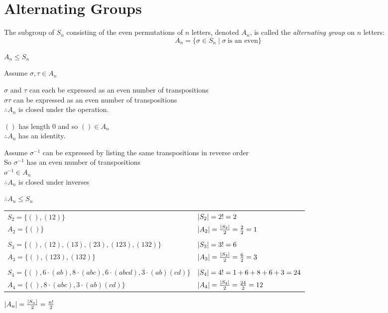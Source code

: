 \documentclass[letterpaper,12pt,fleqn]{article}
\renewcommand{\o}{\sigma}
\renewcommand{\t}{\tau}
\begin{document}
\section*{Alternating Groups}

\begin{definition}
  The subgroup of $S_n$ consisting of the even permutations of $n$ letters,
  denoted $A_n$, is called the \emph{alternating group} on $n$ letters:
  \[A_n=\{\o\in S_n\mid \o\ \mbox{is an even}\}\]
\end{definition}

\begin{theorem}
  $A_n\le S_n$
\end{theorem}

\begin{theproof}
  Assume $\o,\t\in A_n$
  
  $\o$ and $\t$ can each be expressed as an even number of transpositions \\
  $\o\t$ can be expressed as an even number of transpositions \\
  $\therefore A_n$ is closed under the operation.

  $()$ has length $0$ and so $()\in A_n$ \\
  $\therefore A_n$ has an identity.

  Assume $\o^{-1}$ can be expressed by listing the same transpositions in
  reverse order \\
  So $\o^{-1}$ has an even number of transpositions \\
  $o^{-1}\in A_n$ \\
  $\therefore A_n$ is closed under inverses

  $\therefore A_n\le S_n$
\end{theproof}

\begin{example}
  \begin{tabular}{ll}
    $S_2=\{(),(12)\}$ & $\lvert S_2\rvert=2!=2$ \\
    $A_2=\{()\}$ & $\lvert A_2\rvert=\frac{\lvert S_2\rvert}{2}=\frac{2}{2}=1$ \\
    \\
    $S_3=\{(),(12),(13),(23),(123),(132)\}$ & $\lvert S_3\rvert=3!=6$ \\
    $A_3=\{(),(123),(132)\}$ & $\lvert A_3\rvert=\frac{\lvert S_3\rvert}{2}=\frac{6}{2}=3$ \\
    \\
    $S_4=\{(),6\cdot(ab),8\cdot(abc),6\cdot(abcd),3\cdot(ab)(cd)\}$ &
    $\lvert S_4\rvert=4!=1+6+8+6+3=24$ \\
    $A_4=\{(),8\cdot(abc),3\cdot(ab)(cd)\}$ &
    $\lvert A_4\rvert=\frac{\lvert S_4\rvert}{2}=\frac{24}{2}=12$ \\
  \end{tabular}
\end{example}
\newpage
\begin{theorem}
  $\lvert A_n\rvert=\frac{\lvert S_n\rvert}{2}=\frac{n!}{2}$
\end{theorem}
\end{document}
